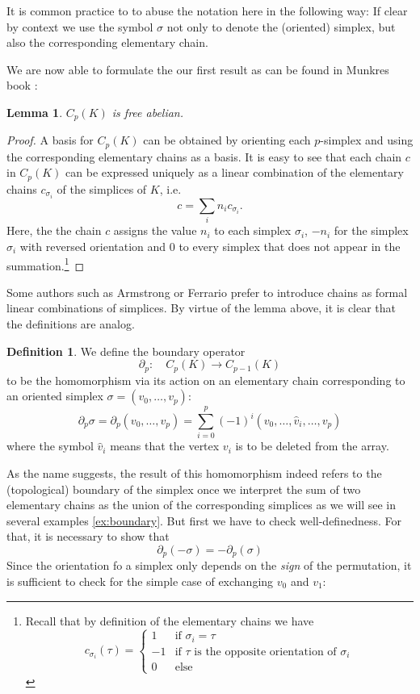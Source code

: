 \documentclass[draft,toc=bib]{scrartcl}
\theoremstyle{plain}
\newtheorem{lemma}[theorem]{Lemma}
\theoremstyle{definition}
\newtheorem	{definition}[theorem]{Definition}
\theoremstyle{remark}
\begin{document}
It is common practice to to abuse the notation here in the following way: If clear by context we use the symbol $\sigma$ not only to denote the (oriented) simplex, but also the corresponding elementary chain.

We are now able to formulate the our first result as can be found in Munkres book \cite[Lemma 5.1, p. 28]{mu}:
\begin{lemma}
	$C_p(K)$ is free abelian. 
\end{lemma}

\begin{proof}
	A basis for $C_p(K)$ can be obtained by orienting each $p$-simplex and using the corresponding elementary chains as a basis.
	It is easy to see that each chain $c$ in $C_p(K)$ can be expressed uniquely as a linear combination of the elementary chains $c_{\sigma_i}$ of the simplices of $K$, i.e.
	\[
	c=\sum_{i}n_i c_{\sigma_i}.
	\]
	Here, the the chain $c$ assigns the value $n_i$ to each simplex $\sigma_i$, $-n_i$ for the simplex $\sigma_i$ with reversed orientation and $0$ to every simplex that does not appear in the summation.\footnote{Recall that by definition of the elementary chains we have \[c_{\sigma_i}(\tau)=\begin{cases}
		1 &\text{if }\sigma_i=\tau\\
		-1&\text{if }\tau \text{ is the opposite orientation of }\sigma_i\\
		0&\text{else}
		\end{cases}
		\]}
\end{proof}

Some authors such as Armstrong \parencite[p.176f]{ar} or Ferrario \parencite[p.60]{fe} prefer to introduce chains as formal linear combinations of simplices. By virtue of the lemma above, it is clear that the definitions are analog.

\begin{definition}
	We define the boundary operator 
	\[
	\partial_p:\quad C_p(K)\to C_{p-1}(K)
	\]
	to be the homomorphism via its action on an elementary chain corresponding to an oriented simplex $\sigma=(v_0,\dots,v_p)$:
	\[
	\partial_p\sigma=\partial_p(v_0,\dots,v_p)=\sum_{i=0}^{p}(-1)^i(v_0,\dots,\hat{v}_i,\dots,v_p)
	\]
	where the symbol $\hat{v}_i$ means that the vertex $v_i$ is to be deleted from the array.
\end{definition}

As the name suggests, the result of this homomorphism indeed refers to the (topological) boundary of the simplex once we interpret the sum of two elementary chains as the union of the corresponding simplices as we will see in several examples \ref{ex:boundary}. But first we have to check well-definedness. For that, it is necessary to show that
\[\partial_p(-\sigma)=-\partial_p(\sigma) 
\]
Since the orientation fo a simplex only depends on the \emph{sign} of the permutation, it is sufficient to check for the simple case of exchanging $v_0$ and $v_1$:
\end{document}
